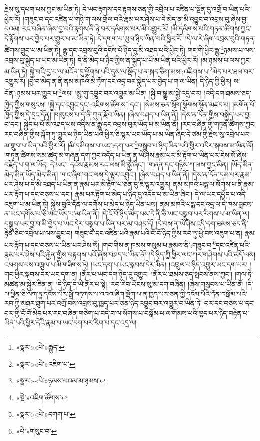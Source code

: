 རྗེས་སུ་དཔག་པས་ཀྱང་མ་ཡིན་ཏེ། དེ་ཡང་རྟགས་དང་རྟགས་ཅན་གྱི་འབྲེལ་པ་འཛིན་པ་སྔོན་དུ་འགྲོ་བ་ཡིན་པའི་ཕྱིར་རོ། །གཟུང་བ་དང་འཛིན་པ་གཉི་ག་ལས་གྲོལ་བའི་རྣམ་པར་ཤེས་པ་དེ་མེད་ན་མི་འབྱུང་བ་འབྲས་བུ་ཞེས་བྱ་བའམ། རང་བཞིན་ཞེས་བྱ་བའི་རྟགས་ནི་ཉེ་བར་དམིགས་པར་མི་འགྱུར་རོ། །མི་དམིགས་པའི་གཏན་ཚིགས་ཀྱང་དེ་རྟོགས་པར་བྱེད་པར་གྱུར་པ་མ་ཡིན་ཏེ། དེ་དགག་པ་ཡུལ་ཉིད་ཡིན་པའི་ཕྱིར་རོ། །དེ་ལ་རེ་ཞིག་འབྲས་བུའི་གཏན་ཚིགས་གྲུབ་པ་མ་ཡིན་ཏེ། རྒྱུ་དང་འབྲས་བུའི་དངོས་པོ་ཉིད་དུ་མི་འཐད་པའི་ཕྱིར་ཏེ། གང་གི་ཕྱིར་རྒྱུ་\footnote{«སྣར་»«པེ་»རྒྱུད་}ཉམས་པ་ལས་འབྲས་བུ་སྐྱེད་པ་ཡང་མ་ཡིན་ཏེ། དེ་ནི་མེད་པ་ཉིད་ཀྱིས་ན་སྐྱེད་པ་པོ་མ་ཡིན་པའི་ཕྱིར་རོ། །མ་ཉམས་པ་ལས་ཀྱང་མ་ཡིན་ཏེ། སྐྱེ་བའི་བྱ་བ་ལ་མངོན་དུ་ཕྱོགས་པའི་དུས་ལ་སྡོད་པ་ན་སྐད་ཅིག་མས་:འཇིགས་པ་\footnote{«སྣར་»«པེ་»འཇིག་པ་}མེད་པར་ཐལ་བར་འགྱུར་རོ། །བྱ་བ་མེད་ན་ནི་ནམ་མཁའི་མེ་ཏོག་དང་འདྲ་བར་སྐྱེད་པར་བྱེད་པ་ག་ལ་ཡིན། དེ་ཉིད་ཀྱི་ཕྱིར། ས་བོན་:ཉམས་པར་གྱུར་པ་\footnote{«སྣར་»«པེ་»ཉམས་པའམ་མ་ཉམས་}ལས། །མྱུ་གུ་འབྱུང་བར་འགྱུར་མ་ཡིན། །སྐྱེ་བ་སྒྱུ་མ་སྐྱེ་འདྲ་བར། །འདི་དག་ཐམས་ཅད་ཁྱེད་ཀྱིས་གསུངས། །སྐྱེ་དང་འབྱུང་དང་:འཇིགས་ཚོགས་\footnote{«སྡེ་»འཇིག་ཚོགས་}དང་། །སེམས་ཅན་སྲོག་སྩོགས་སྟོན་མཛད་པ། །མགོན་པོ་ཁྱོད་ཀྱིས་དེ་དྲང་དོན། །གསུངས་པ་དེ་ནི་ཀུན་རྫོབ་ཡིན། །ཞེས་བཤད་པ་ཡིན་ནོ། །དེས་ན་དོན་གྱིས་བསྐྱེད་པར་བྱ་བ་དང་། སྐྱེད་པ་པོ་མི་འཐད་པས་འདིས་ན་རྒྱུ་དང་འབྲས་བུར་ཡོད་པ་མ་ཡིན་ནོ། །རང་བཞིན་གྱི་གཏན་ཚིགས་ཀྱང་རང་བཞིན་གྱིས་ལྐོག་ཏུ་གྱུར་པ་ཉིད་ཡིན་པའི་ཕྱིར་ཅི་ལྟར་ཡང་ཡོད་པ་མ་ཡིན་ཞིང་དེ་ཙམ་གྱི་རྗེས་སུ་འབྲེལ་པར་མ་གྲུབ་པ་ཡིན་པའི་ཕྱིར་རོ། །མི་དམིགས་པ་ཡང་:དག་པར་\footnote{«སྣར་»«པེ་»དགག་པ་}བསྒྲུབ་པ་ཉིད་ཡིན་པའི་ཕྱིར་འདིར་སྐབས་མ་ཡིན་ནོ། །གཏན་ཚིགས་སམ་ཚད་མ་གཞན་དག་ཀྱང་འདོད་པ་ཡིན་ན་ཡེ་ཤེས་རྣམ་པར་མི་རྟོག་པ་ཡིན་པར་ངེས་སོ་ཞེས་བརྗོད་པ་ག་ལ་ཡོད། དེ་ཡང་། དངོས་རྣམས་རང་ལས་མི་སྐྱེ་ཞིང་། །གཞན་དང་གཉིས་ཀ་ལས་ཀྱང་མིན། །ཡོད་མིན་མེད་མིན་ཡོད་མེད་མིན། །གང་ཞིག་གང་ལས་དེ་ལྟར་འབྱུང་། །ཞེས་བཤད་པ་ཡིན་ནོ། །དེས་ན་དོན་དམ་པར་རྣམ་པར་ཤེས་པ་དེ་མི་འཐད་པ་ཡིན་ན་རྣམ་པར་མི་རྟོག་པ་ཅན་དུ་ཇི་ལྟར་འགྱུར། ནམ་མཁའི་པདྨ་ལ་སོགས་པ་ནི་རྣམ་པར་རྟོག་པ་དང་བཅས་པ་དང་། རྣམ་པར་རྟོག་པ་མེད་པ་ཉིད་དུ་འདོད་པ་མ་ཡིན་ཞིང་། དེ་ལ་ཡང་དཔྱོད་པ་འདི་འཇུག་པ་མ་ཡིན་ཏེ། སྐྱེས་བུའི་དོན་ལ་དགོས་པ་མེད་པ་ཉིད་ཡིན་པས། ནམ་མཁའི་པདྨ་དང་འདྲ་ལ་དེ་ཁས་བླངས་ན་ཡང་དགོས་པ་ཅི་ཡང་ཡོད་པ་མ་ཡིན་ནོ། །དེ་ངོ་བོ་ཉིད་མེད་པས་དེ་ནི་ཅི་ཡང་བསྒྲུབ་པར་རིགས་པ་མ་ཡིན་ལ། བསྒྲུབ་པར་བྱ་བ་མི་བྱེད་པ་ཡང་དེར་བསྒྲུབ་པ་ཡིན་པར་མ་བཤད་དོ། །དེ་བས་ན་ཡེ་ཤེས་འདི་དག་ཐམས་ཅད་ནི་རྟེན་ཅིང་འབྲེལ་པ་ལས་བྱུང་བ། གཟུང་བ་དང་འཛིན་པའི་རྣམ་པའི་ངོ་བོ་ཉིད་ཀྱིས་རབ་ཏུ་ཕྱེ་བས་འཇུག་པ་ན། རྣམ་པར་རྟོག་པ་དང་བཅས་པ་ཡིན་པར་ཤེས་སོ། །གང་གིས་ན་ཁམས་གསུམ་པ་རྣམས་ནི་:གཟུང་བ་\footnote{«པེ་»གསུང་བ་}དང་འཛིན་པའི་རྣམ་པར་ཤེས་པའི་རྐྱེན་གྱིས་བརྟགས་པའོ་ཞེས་བཤད་པ་ཡིན་ནོ། །དེ་ཉིད་ཀྱི་ཕྱིར་ལང་ཀར་གཤེགས་པའི་མདོ་ལས། འཕགས་པས་འཁྲུལ་པ་མི་གཟིགས་ཏེ། །ཡང་དག་པ་ཡང་སྐབས་དེར་མིན། །འཁྲུལ་པ་ཉིད་འགྱུར་ཡང་དག་པར། །གང་ཕྱིར་སྐབས་དེར་ཡང་དག་ན། །ནོར་པ་ཡང་དག་ཉིད་དུ་འགྱུར། །ནོར་པ་ཐམས་ཅད་སྤངས་ནས་ཀྱང་། །གལ་ཏེ་མཚན་མ་སྐྱེར་ཟིན་ན། །དེ་ཉིད་དེ་ཡི་ནོར་པ་སྟེ། །རབ་རིབ་ཡོངས་སུ་མ་དག་བཞིན། །ཞེས་གསུངས་པ་ཡིན་ནོ། །དེ་ལ་ཕྱིན་ཅི་ལོག་ཏུ་དངོས་པོར་སྒྲོ་བཏགས་པ་འབའ་ཞིག་ལྡོག་པ་ན་ཁྱད་པར་ཅན་གྱི་དངོས་པོའི་དོན་བསྒོམ་པའི་རབ་ཀྱི་མཐར་ཐུག་པར་འགྲོ་བས་འབྲས་བུ་ཁྱད་པར་ཅན་ཉིད་འབྱུང་བར་འགྱུར་བ་ཡིན་ཏེ། བར་དང་བཅས་པ་དང་བར་གྱི་ངོ་བོ་མེད་པར་རང་བཞིན་གཅིག་པ་བདེ་བ་ལ་སོགས་པ་བསྒོམ་པ་ལ་གོམས་པའི་ཁྱད་པར་ཉིད་བརྟེན་པ་ཡིན་པའི་ཕྱིར་དེའི་རྣམ་པ་ཡང་དག་པར་རིག་པ་དང་འདྲ་ལ། 